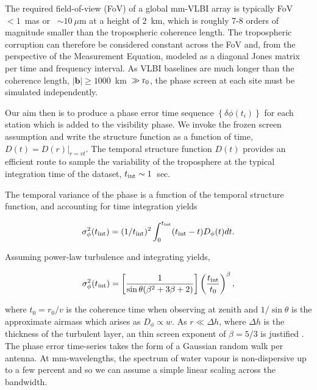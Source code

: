 The required field-of-view (FoV) of a global mm-VLBI array is typically FoV~$< 1$~mas or ~$\sim10~\mu$m at a height of 2~km, which is roughly 7-8 orders of magnitude smaller than the tropospheric coherence length. The tropospheric corruption can therefore be considered constant across the FoV and, from the perspective of the Measurement Equation, modeled as a diagonal Jones matrix per time and frequency interval. As VLBI baselines are much longer than the coherence length, $|\mathbf{b}| \ge 1000$~km~$\gg \rm r_0$, the phase screen at each site must be simulated independently.

Our aim then is to produce a phase error time sequence $\left\{\delta \phi(t_i)\right\}$ for each station which is added to the visibility phase. We invoke the frozen screen assumption and write the structure function as a function of time, $D (t) =  D(r)|_{r=vt}$. The temporal structure function $D(t)$ provides an efficient route to sample the variability of the troposphere at the typical integration time of the dataset, $t_{\rm int} \sim 1$~sec. 

The temporal variance of the phase is a function of the temporal structure function, and accounting for time integration yields \citep*[see][B3]{Treuhaft_1987} 

\begin{equation}
\sigma^2_{\phi}(t_{\rm int}) = (1/t_{\rm int})^2 \int_{0}^{t_{\rm int}} (t_{\rm int}-t) D_{\phi}(t) dt.
\end{equation}

Assuming power-law turbulence and integrating yields, 

\begin{equation}
\sigma^2_\phi (t_{\rm int})=\left[\frac{1}{\sin\theta(\beta^2 +3\beta +2)}\right]\left(\frac{t_{\rm int}}{t_0}\right)^{\beta},
\end{equation}


\noindent where $t_0 = r_0/v$ is the coherence time when observing at zenith and $1/\sin\theta$ is the approximate airmass which arises as $D_\phi \propto w$. As $r \ll \Delta h$, where $\Delta h$ is the thickness of the turbulent layer, an thin screen exponent of $\beta = 5/3$ is justified \citep*{Treuhaft_1987}. The phase error time-series takes the form of a Gaussian random walk per antenna. At mm-wavelengths, the spectrum of water vapour is non-dispersive up to a few percent \citep{Curtis_2009} and so we can assume a simple linear scaling across the bandwidth.



